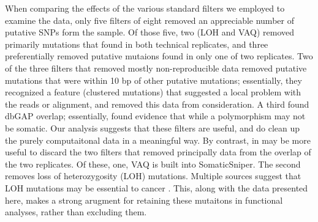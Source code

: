 \documentclass[11pt]{article} %
\begin{document}
When comparing the effects of the various standard filters we employed to examine the data, only five filters of eight removed an appreciable number of putative SNPs form the sample. Of those five, two (LOH and VAQ) removed primarily mutations that found in both technical replicates, and three preferentially removed putative mutaions found in only one of two replicates. Two of the three filters that removed mostly non-reproducible data removed putative mutations that were within 10 bp of other putative mutations; essentially, they recognized a feature (clustered mutations) that suggested a local problem with the reads or alignment, and removed this data from consideration. A third found dbGAP overlap; essentially, found evidence that while a polymorphism may not be somatic. Our analysis suggests that these filters are useful, and do clean up the purely computaitonal data in a meaningful way.
By contrast, in may be more useful to discard the two filters that removed principally data from the overlap of the two replicates. Of these, one, VAQ is built into SomaticSniper. The second removes loss of heterozygosity (LOH) mutations. Multiple sources suggest that LOH mutations may be essential to cancer \cite{LOH}. This, along with the data presented here, makes a strong arugment for retaining these mutaitons in functional analyses, rather than excluding them.
\end{document}
